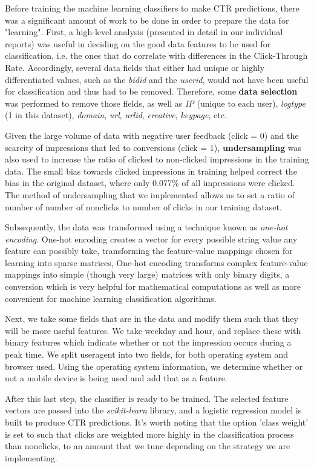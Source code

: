 \documentclass{sig-alternate-05-2015}
\begin{document}
Before training the machine learning classifiers to make CTR predictions, there was a significant amount of work to be done in order to prepare the data for "learning". First, a high-level analysis (presented in detail in our individual reports) was useful in deciding on the good data features to be used for classification, i.e. the ones that do correlate with differences in the Click-Through Rate. Accordingly, several data fields that either had unique or highly differentiated values, such as the \textit{bidid} and the \textit{userid}, would not have been useful for classification and thus had to be removed. Therefore, some \textbf{data selection} was performed to remove those fields, as well as \textit{IP} (unique to each user), \textit{logtype} (1 in this dataset), \textit{domain}, \textit{url}, \textit{urlid}, \textit{creative}, \textit{keypage}, etc.

Given the large volume of data with negative user feedback (click = 0) and the scarcity of impressions that led to conversions (click = 1), \textbf{undersampling} was also used to increase the ratio of clicked to non-clicked impressions in the training data. The small bias towards clicked impressions in training helped correct the bias in the original dataset, where only 0.077\% of all impressions were clicked. The method of undersampling that we implemented allows us to set a ratio of number of number of nonclicks to number of clicks in our training dataset.

Subsequently, the data was transformed using a technique known as \textit{one-hot encoding}. One-hot encoding creates a vector for every possible string value any feature can possibly take, transforming the feature-value mappings chosen for learning into sparse matrices, One-hot encoding transforms complex feature-value mappings into simple (though very large) matrices with only binary digits, a conversion which is very helpful for mathematical computations as well as more convenient for machine learning classification algorithms.

Next, we take some fields that are in the data and modify them such that they will be more useful features. We take weekday and hour, and replace these with binary features which indicate whether or not the impression occurs during a peak time. We split useragent into two fields, for both operating system and browser used. Using the operating system information, we determine whether or not a mobile device is being used and add that as a feature.

After this last step, the classifier is ready to be trained. The selected feature vectors are passed into the \textit{scikit-learn} library, and a logistic regression model is built to produce CTR predictions. It's worth noting that the option 'class weight' is set to such that clicks are weighted more highly in the classification process than nonclicks, to an amount that we tune depending on the strategy we are implementing.
\end{document}
